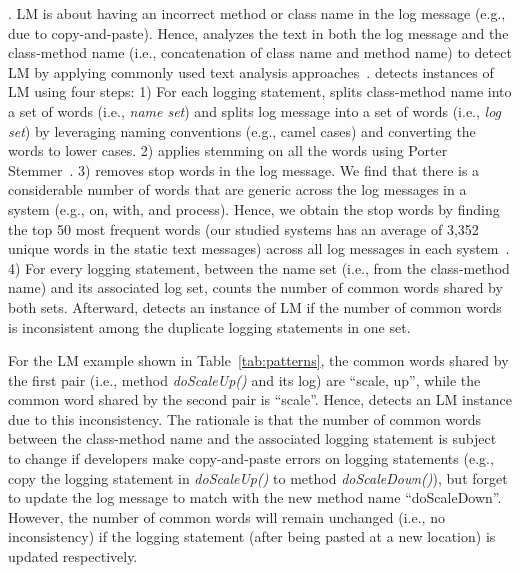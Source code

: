 \vspace{-0.1cm}
. LM is about having an incorrect method or class name in the log message (e.g., due to copy-and-paste). Hence, \toolS analyzes the text in both the log message and the class-method name (i.e., concatenation of class name and method name) to detect LM by applying commonly used text analysis approaches~\cite{Chen:2016:SUT:2992358.2992444}. \toolS detects instances of LM using four steps: 1) For each logging statement, \toolS splits class-method name into a set of words (i.e., {\em name set}) and splits log message into a set of words (i.e., {\em log set}) by leveraging naming conventions (e.g., camel cases) and converting the words to lower cases. 2) \toolS applies stemming on all the words using Porter Stemmer~\cite{stemmer}. 3) \toolS removes stop words in the log message. We find that there is a considerable number of words that are generic across the log messages in a system (e.g., on, with, and process). Hence, we obtain the stop words by finding the top 50 most frequent words (our studied systems has an average of 3,352 unique words in the static text messages) across all log messages in each system~\cite{Yang:2014:SIS:2683115.2683138}. 4) For every logging statement, between the name set (i.e., from the class-method name) and its associated log set, \toolS counts the number of common words shared by both sets. Afterward, \toolS detects an instance of LM if the number of common words is inconsistent among the duplicate logging statements in one set. 

For the LM example shown in Table~\ref{tab:patterns}, the common words shared by the first pair (i.e., method {\em doScaleUp()} and its log) are ``scale, up'', while the common word shared by the second pair is ``scale''. Hence, \toolS detects an LM instance due to this inconsistency.
The rationale is that the number of common words between the class-method name and the associated logging statement is subject to change if developers make copy-and-paste errors on logging statements (e.g., copy the logging statement in {\em doScaleUp()} to method {\em doScaleDown()}), but forget to update the log message to match with the new method name ``doScaleDown''.
However, the number of common words will remain unchanged (i.e., no inconsistency) if the logging statement (after being pasted at a new location) is updated respectively.



